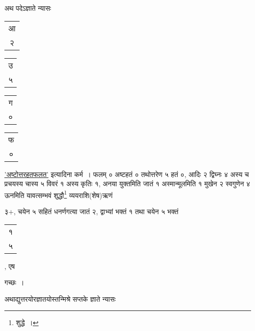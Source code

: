 \documentclass[10pt, openany]{book}
\begin{document}
{{{अथ पदेऽज्ञाते न्यासः\textendash \hspace{2mm} \begin{tabular}{|c|}आ \\२\\\hline \end{tabular}\begin{tabular}{c|} उ  \\ ५ \\\hline \end{tabular}\begin{tabular}{c|}   ग  \\ ० \\\hline \end{tabular}\begin{tabular}{c|}  फ \\  ० \\\hline \end{tabular}
\vspace{3mm}

{\hyperref[87]{'अष्टोत्तरहतफलत'} इत्यादिना कर्म~। फलम् ० अष्टहतं ० तथोत्तरेण ५ हतं ०,
आदिः}
{२ द्विघ्नः ४ अस्य च प्रचयस्य चास्य ५ विवरं १ अस्य कृतिः १, अनया
युक्तमिति जातं १}
{अस्मान्मूलमिति १ मुखेन २ स्वगुणेन ४ ऊनमिति यावत्सम्भवं शुद्धौ\renewcommand{\thefootnote}{११}\footnote{शुद्धे~।}
व्ययराशि(शेष)ऋणं}
{३$+$, चयेन ५ सहितं धनर्णगत्या जातं २, द्वाभ्यां भक्तं १ तथा चयेन ५ भक्तं\begin{tabular}{c}१\\ ५\end{tabular}, एष}
{गच्छः~।}
\vspace{3mm}

{अथाद्युत्तरयोरज्ञातयोस्तन्मिश्रे सप्तके ज्ञाते न्यासः\textemdash}
\vspace{3mm}

\vspace{3mm}

}}}
\end{document}
